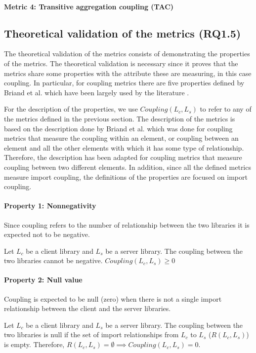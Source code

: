 \paragraph{Metric 4: Transitive aggregation coupling (TAC)}


\subsection{Theoretical validation of the metrics (RQ1.5)}
The theoretical validation of the metrics consists of demonstrating the properties of the metrics. The theoretical validation is necessary since it proves that the metrics share some properties with the attribute these are measuring, in this case coupling. In particular, for coupling metrics there are five properties defined by Briand et al. \cite{briand1996property} which have been largely used by the literature .

For the description of the properties, we use $Coupling(L_c, L_s)$ to refer to any of the metrics defined in the previous section. The description of the metrics is based on the description done by Briand et al. which was done for coupling metrics that measure the coupling within an element, or coupling between an element and all the other elements with which it has some type of relationship. Therefore, the description has been adapted for coupling metrics that measure coupling between two different elements. In addition, since all the defined metrics measure import coupling, the definitions of the properties are focused on import coupling.

\paragraph{Property 1: Nonnegativity}
Since coupling refers to the number of relationship between the two libraries it is expected not to be negative.

Let $L_c$ be a client library and $L_s$ be a server library. The coupling between the two libraries cannot be negative. $Coupling(L_c, L_s) \ge 0$

\paragraph{Property 2: Null value}
Coupling is expected to be null (zero) when there is not a single import relationship between the client and the server libraries.

Let $L_c$ be a client library and $L_s$ be a server library. The coupling between the two libraries is null if the set of import relationships from $L_c$ to $L_s$ ($R(L_c, L_s)$) is empty. Therefore, $R(L_c, L_s) = \emptyset \implies Coupling(L_c, L_s) = 0$.


